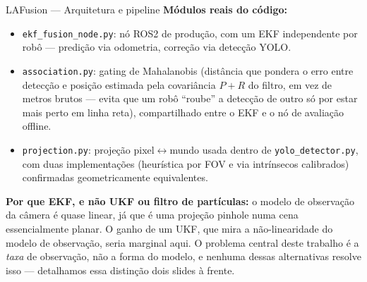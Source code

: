 \documentclass[aspectratio=169]{beamer}
\begin{document}
\begin{frame}{LAFusion — Arquitetura e pipeline}
\vspace{0.15cm}
\textbf{Módulos reais do código:}
\begin{itemize}
\item \texttt{ekf\_fusion\_node.py}: nó ROS2 de produção, com um EKF independente por robô — predição via odometria, correção via detecção YOLO.
\item \texttt{association.py}: gating de Mahalanobis (distância que pondera o erro entre detecção e posição estimada pela covariância $P+R$ do filtro, em vez de metros brutos — evita que um robô ``roube'' a detecção de outro só por estar mais perto em linha reta), compartilhado entre o EKF e o nó de avaliação offline.
\item \texttt{projection.py}: projeção pixel$\leftrightarrow$mundo usada dentro de \texttt{yolo\_detector.py}, com duas implementações (heurística por FOV e via intrínsecos calibrados) confirmadas geometricamente equivalentes.
\end{itemize}

\vspace{0.3cm}
\textbf{Por que EKF, e não UKF ou filtro de partículas:} o modelo de observação da câmera é quase linear, já que é uma projeção pinhole numa cena essencialmente planar. O ganho de um UKF, que mira a não-linearidade do modelo de observação, seria marginal aqui. O problema central deste trabalho é a \emph{taxa} de observação, não a forma do modelo, e nenhuma dessas alternativas resolve isso — detalhamos essa distinção dois slides à frente.
\end{frame}
\end{document}
